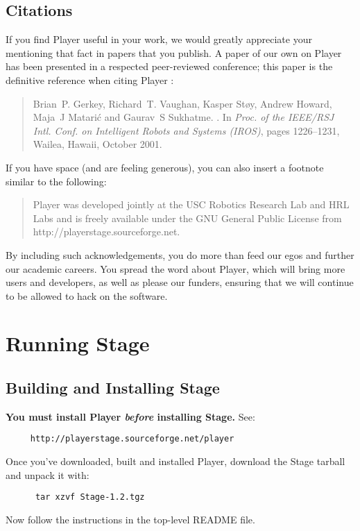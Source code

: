 \documentclass[11pt]{report}
\begin{document}
\section{Citations}
If you find Player useful in your work, we would greatly appreciate your
mentioning that fact in papers that you publish.  A paper of our own
on Player has been presented in a respected peer-reviewed conference; this
paper is the definitive reference when citing Player \cite{GerkeyVaughan01a}:
\begin{quote}
Brian~P. Gerkey, Richard~T. Vaughan, Kasper St\o{}y, Andrew Howard,
Maja~J Matari\'c and Gaurav~S Sukhatme.
.
\newblock In {\em Proc. of the IEEE/RSJ Intl. Conf. on Intelligent Robots and
  Systems (IROS)}, pages 1226--1231, Wailea, Hawaii, October 2001.
\end{quote}
If you have space (and are feeling generous), you can also insert a footnote
similar to the following:
\begin{quote}
Player was developed jointly at the USC Robotics Research Lab
and HRL Labs and is freely available under the GNU General Public License
from http://playerstage.sourceforge.net.
\end{quote}
By including such acknowledgements, you do more than feed our egos and further 
our academic careers.  You spread the word about Player, which will bring more
users and developers, as well as please our funders, ensuring that we will
continue to be allowed to hack on the software.

\chapter{Running Stage}
  \section{Building and Installing Stage}

    {\bf You must install Player {\sl before} installing Stage.} 
    See:
	\begin{verbatim}
	 http://playerstage.sourceforge.net/player
	\end{verbatim}

    \noindent Once you've downloaded, built and installed Player, download
    the Stage tarball and unpack it with:
      \begin{verbatim}
      tar xzvf Stage-1.2.tgz
      \end{verbatim}
    Now follow the instructions in the top-level README file.
\end{document}
